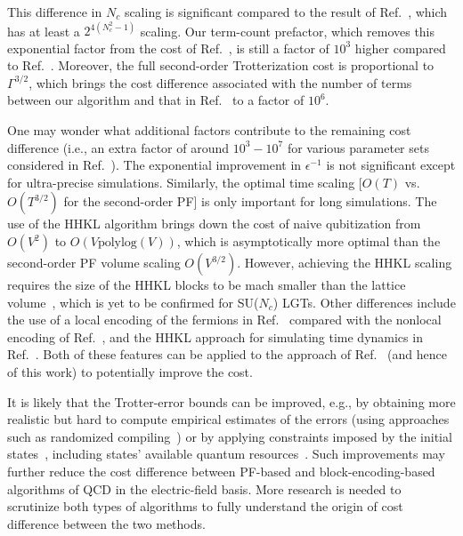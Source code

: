 \documentclass[aps,prd,twocolumn,showpacs,groupedaddress,superscriptaddress,nofootinbib,floatfix,preprintnumbers,longbibliography]{revtex4-1}
\begin{document}
This difference in $N_c$ scaling is significant compared to the result of Ref.~\cite{Kan:2021xfc}, which has at least a $2^{4(N_c^2-1)}$ scaling. Our term-count prefactor, which removes this exponential factor from the cost of Ref.~\cite{Kan:2021xfc}, is still a factor of $10^3$ higher compared to Ref.~\cite{Rhodes:2024zbr}. Moreover, the full second-order Trotterization cost is proportional to $\Gamma^{3/2}$, which brings the cost difference associated with the number of terms between our algorithm and that in Ref.~\cite{Rhodes:2024zbr} to a factor of $10^6$. 

One may wonder what additional factors contribute to the remaining cost difference (i.e., an extra factor of around $10^3-10^7$ for various parameter sets considered in Ref.~\cite{Rhodes:2024zbr}). The exponential improvement in $\epsilon^{-1}$ is not significant except for ultra-precise simulations. Similarly, the optimal time scaling [$O(T)$ vs. $O(T^{3/2})$ for the second-order PF] is only important for long simulations. The use of the HHKL algorithm brings down the cost of naive qubitization from $O(V^2)$ to $O(V\text{polylog}(V))$, which is asymptotically more optimal than the second-order PF volume scaling $O(V^{3/2})$. However, achieving the HHKL scaling requires the size of the HHKL blocks to be mach smaller than the lattice volume~\cite{Haah:2018ekc}, which is yet to be confirmed for SU($N_c$) LGTs. Other differences include the use of a local encoding of the fermions in Ref.~\cite{Rhodes:2024zbr} compared with the nonlocal encoding of Ref.~\cite{Kan:2021xfc}, and the HHKL approach for simulating time dynamics in Ref.~\cite{Rhodes:2024zbr}. Both of these features can be applied to the approach of Ref.~\cite{Kan:2021xfc} (and hence of this work) to potentially improve the cost. 

It is likely that the Trotter-error bounds can be improved, e.g., by obtaining more realistic but hard to compute empirical estimates of the errors (using approaches such as randomized compiling~\cite{Childs:2019atb,Campbell:2019fez}) or by applying constraints imposed by the initial states~\cite{Heyl:2019rtj,Sahinoglu:2020dwp,Yi:2021cxm,Gong:2023hbt,Burgarth:2023cal,Su:2020gzf,Watson:2023oov,Mizuta:2025aoi}, including states' available quantum resources~\cite{Zhao:2024xtl,Zhang:2026cbs}. Such improvements may further reduce the cost difference between PF-based and block-encoding-based algorithms of QCD in the electric-field basis. More research is needed to scrutinize both types of algorithms to fully understand the origin of cost difference between the two methods.
\end{document}
